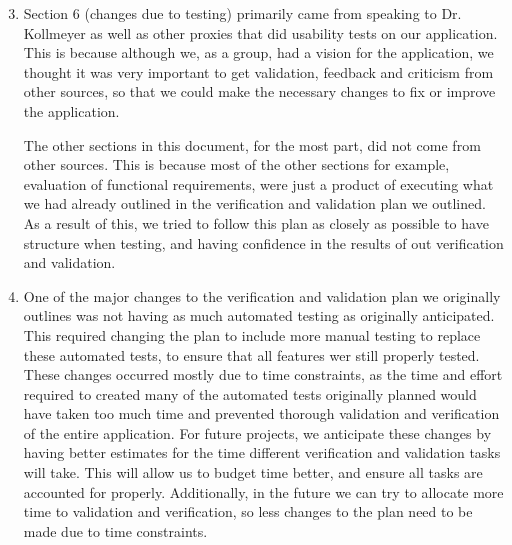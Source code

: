 \documentclass[12pt, titlepage]{article}
\begin{document}
\begin{enumerate}
\setcounter{enumi}{2}
    \item Section 6 (changes due to testing) primarily came from speaking to Dr. Kollmeyer as well as other proxies that did usability tests on our application. This is because although we, as a group, had a vision for the application, we thought it was very important to get validation, feedback and criticism from other sources, so that we could make the necessary changes to fix or improve the application.

    The other sections in this document, for the most part, did not come from other sources. This is because most of the other sections for example, evaluation of functional requirements, were just a product of executing what we had already outlined in the verification and validation plan we outlined. As a result of this, we tried to follow this plan as closely as possible to have structure when testing, and having confidence in the results of out verification and validation.

    \item One of the major changes to the verification and validation plan we originally outlines was not having as much automated testing as originally anticipated. This required changing the plan to include more manual testing to replace these automated tests, to ensure that all features wer still properly tested. These changes occurred mostly due to time constraints, as the time and effort required to created many of the automated tests originally planned would have taken too much time and prevented thorough validation and verification of the entire application. For future projects, we anticipate these changes by having better estimates for the time different verification and validation tasks will take. This will allow us to budget time better, and ensure all tasks are accounted for properly. Additionally, in the future we can try to allocate more time to validation and verification, so less changes to the plan need to be made due to time constraints.
\end{enumerate} 
\end{document}
